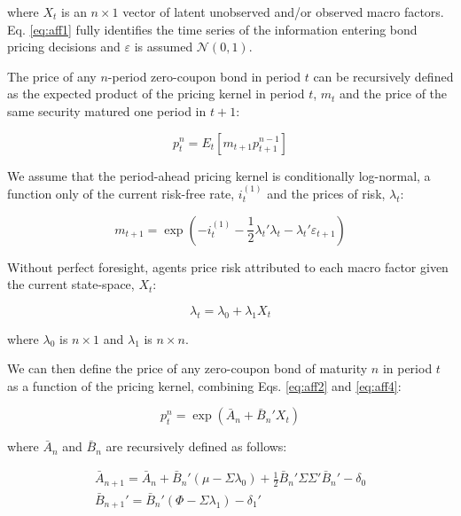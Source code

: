 \documentclass{article}
\numberwithin{equation}{section}
\begin{document}
where $X_t$ is an $n\times1$ vector of latent unobserved and/or observed macro
factors. Eq. \ref{eq:aff1} fully identifies the time series of the information
entering bond pricing decisions and $\varepsilon$ is assumed
$\mathcal{N}(0,1)$.

The price of any $n$-period zero-coupon bond in period $t$ can be recursively
defined as the expected product of the pricing kernel in period $t$, $m_t$ and
the price of the same security matured one period in $t+1$:

\begin{equation}
    p_t^n=E_t[m_{t+1}p_{t+1}^{n-1}]
    \label{eq:aff2}
\end{equation}

We assume that the period-ahead pricing kernel is conditionally log-normal,
a function only of the current risk-free rate, $i_t^{(1)}$ and the prices of
risk, $\lambda_t$:

\begin{equation}
    m_{t+1}=\exp{(-i_t^{(1)}-\frac{1}{2}\lambda_t'\lambda_t-\lambda_t'\varepsilon_{t+1})}
    \label{eq:aff3}
\end{equation}

Without perfect foresight, agents price risk attributed to each macro factor
given the current state-space, $X_t$:

\begin{equation}
    \lambda_t = \lambda_0 + \lambda_1X_t
    \label{eq:aff4}
\end{equation}

where $\lambda_0$ is $n\times1$ and $\lambda_1$ is $n\times{n}$.

We can then define the price of any zero-coupon bond of maturity $n$ in period
$t$ as a function of the pricing kernel, combining Eqs. \ref{eq:aff2} and
\ref{eq:aff4}:

\begin{equation}
    p_t^n=\exp{(\bar{A}_n+\bar{B}_n'X_t)}
    \label{eq:aff5}
\end{equation}

where $\bar{A}_n$ and $\bar{B}_n$ are recursively defined as follows:

\begin{eqnarray}
    \bar{A}_{n+1}=\bar{A}_{n}+\bar{B}_n'(\mu-\Sigma\lambda_0)+\frac{1}{2}
                  \bar{B}_n'\Sigma\Sigma'\bar{B}_n'-\delta_0  \nonumber \\
    \bar{B}_{n+1}'=\bar{B}_n'(\Phi-\Sigma\lambda_1)-\delta_1'
    \label{eq:aff6}
\end{eqnarray}
\end{document}

